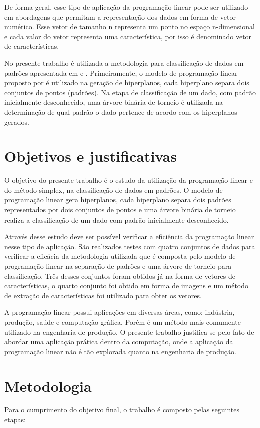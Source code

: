 De forma geral, esse tipo de aplicação da programação linear pode ser utilizado em abordagens que permitam a representação dos dados em forma de vetor numérico. Esse vetor de tamanho n representa um ponto no espaço n-dimensional e cada valor do vetor representa uma característica, por isso é denominado vetor de características.

No presente trabalho é utilizada a metodologia para classificação de dados em padrões apresentada em  e . Primeiramente, o modelo de programação linear proposto por  é utilizado na geração de hiperplanos, cada hiperplano separa dois conjuntos de pontos (padrões). Na etapa de classificação de um dado, com padrão inicialmente desconhecido, uma árvore binária de torneio é utilizada na determinação de qual padrão o dado pertence de acordo com os hiperplanos gerados.

\section{Objetivos e justificativas}
O objetivo do presente trabalho é o estudo da utilização da programação linear e do método simplex, na classificação de dados em padrões. O modelo de programação linear gera hiperplanos, cada hiperplano separa dois padrões representados por dois conjuntos de pontos e uma árvore binária de torneio realiza a classificação de um dado com padrão inicialmente desconhecido.

Através desse estudo deve ser possível verificar a eficiência da programação linear nesse tipo de aplicação. São realizados testes com quatro conjuntos de dados para verificar a eficácia da metodologia utilizada que é composta pelo modelo de programação linear na separação de padrões e uma árvore de torneio para classificação. Três desses conjuntos foram obtidos já na forma de vetores de características, o quarto conjunto foi obtido em forma de imagens e um método de extração de características foi utilizado para obter os vetores.

A programação linear possui aplicações em diversas áreas, como: indústria, produção, saúde e computação gráfica. Porém é um método mais comumente utilizado na engenharia de produção. O presente trabalho justifica-se pelo fato de abordar uma aplicação prática dentro da computação, onde a aplicação da programação linear não é tão explorada quanto na engenharia de produção.

\section{Metodologia}
Para o cumprimento do objetivo final, o trabalho é composto pelas seguintes etapas:

